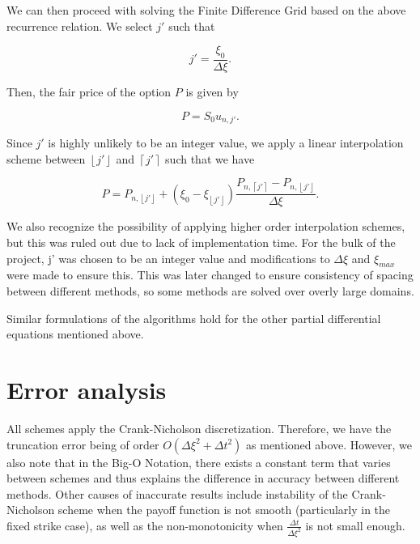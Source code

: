 \documentclass[12pt]{report}
\begin{document}
We can then proceed with solving the Finite Difference Grid based on the above recurrence relation. We select \(j'\) such that

\begin{equation}
  j' = \frac{\xi_0}{\Delta\xi}.
\end{equation}

Then, the fair price of the option \(P\) is given by

\begin{equation}
  P = S_0 u_{n, j'}.
\end{equation}

Since \(j'\) is highly unlikely to be an integer value, we apply a linear interpolation scheme between \(\left \lfloor{j'}\right \rfloor\) and \(\left \lceil{j'}\right \rceil\) such that we have

\begin{equation}
  P = P_{n, \left \lfloor{j'}\right \rfloor} + (\xi_0 - \xi_{\left \lfloor{j'}\right \rfloor })\frac{P_{n, \left \lceil{j'}\right \rceil } - P_{n, \left \lfloor{j'}\right \rfloor }}{\Delta\xi}.
\end{equation}

We also recognize the possibility of applying higher order interpolation schemes, but this was ruled out due to lack of implementation time. For the bulk of the project, j' was chosen to be an integer value and modifications to \(\Delta\xi\) and \(\xi_{max}\) were made to ensure this. This was later changed to ensure consistency of spacing between different methods, so some methods are solved over overly large domains.

Similar formulations of the algorithms hold for the other partial differential equations mentioned above.

\chapter{Error analysis}
All schemes apply the Crank-Nicholson discretization. Therefore, we have the truncation error being of order \(O(\Delta\xi^2 + \Delta t^2)\) as mentioned above. However, we also note that in the Big-O Notation, there exists a constant term that varies between schemes and thus explains the difference in accuracy between different methods. Other causes of inaccurate results include instability of the Crank-Nicholson scheme when the payoff function is not smooth (particularly in the fixed strike case), as well as the non-monotonicity when \(\frac{\Delta t}{\Delta\xi^2}\) is not small enough.
\end{document}
